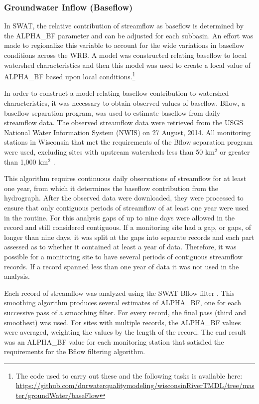 \subsubsection{Groundwater Inflow (Baseflow)}\label{sec:baseflow}
	In SWAT, the relative contribution of streamflow as baseflow is determined by the ALPHA\_BF parameter and can be adjusted for each subbasin. An effort was made to regionalize this variable to account for the wide variations in baseflow conditions across the WRB. A model was constructed relating baseflow to local watershed characteristics and then this model was used to create a local value of ALPHA\_BF based upon local conditions.\footnote{The code used to carry out these and the following tasks is available here: \url{https://github.com/dnrwaterqualitymodeling/wisconsinRiverTMDL/tree/master/groundWater/baseFlow}}
	
	In order to construct a model relating baseflow contribution to watershed characteristics, it was necessary to obtain observed values of baseflow. Bflow, a baseflow separation program, \citep{arnold_automated_1995} was used to estimate baseflow from daily streamflow data. The observed streamflow data were retrieved from the USGS National Water Information System (NWIS) \citep{usgs_nwis_2014} on 27 August, 2014. All monitoring stations in Wisconsin that met the requirements of the Bflow separation program were used, excluding sites with upstream watersheds less than 50 km$^2$ or greater than 1,000 km$^2$ \citep{arnold_regional_2000}.
	
	This algorithm requires continuous daily observations of streamflow for at least one year, from which it determines the baseflow contribution from the hydrograph.	After the observed data were downloaded, they were processed to ensure that only contiguous periods of streamflow of at least one year were used in the routine. For this analysis gaps of up to nine days were allowed in the record and still considered contiguous. If a monitoring site had a gap, or gaps, of longer than nine days, it was split at the gaps into separate records and each part assessed as to whether it contained at least a year of data. Therefore, it was possible for a monitoring site to have several periods of contiguous streamflow records. If a record spanned less than one year of data it was not used in the analysis.
	
	Each record of streamflow was analyzed using the SWAT Bflow filter \citep{arnold_automated_1995}. This smoothing algorithm produces several estimates of ALPHA\_BF, one for each successive pass of a smoothing filter. For every record, the final pass (third and smoothest) was used. For sites with multiple records, the ALPHA\_BF values were averaged, weighting the values by the length of the record. The end result was an ALPHA\_BF value for each monitoring station that satisfied the requirements for the Bflow filtering algorithm.  


